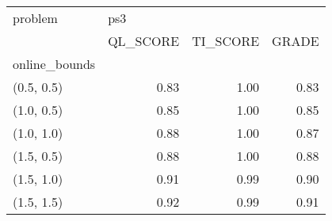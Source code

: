 \begin{tabular}{lrrr}
\toprule
problem & \multicolumn{3}{l}{ps3} \\
{} & QL\_SCORE & TI\_SCORE & GRADE \\
online\_bounds &          &          &       \\
\midrule
(0.5, 0.5)    &     0.83 &     1.00 &  0.83 \\
(1.0, 0.5)    &     0.85 &     1.00 &  0.85 \\
(1.0, 1.0)    &     0.88 &     1.00 &  0.87 \\
(1.5, 0.5)    &     0.88 &     1.00 &  0.88 \\
(1.5, 1.0)    &     0.91 &     0.99 &  0.90 \\
(1.5, 1.5)    &     0.92 &     0.99 &  0.91 \\
\bottomrule
\end{tabular}
